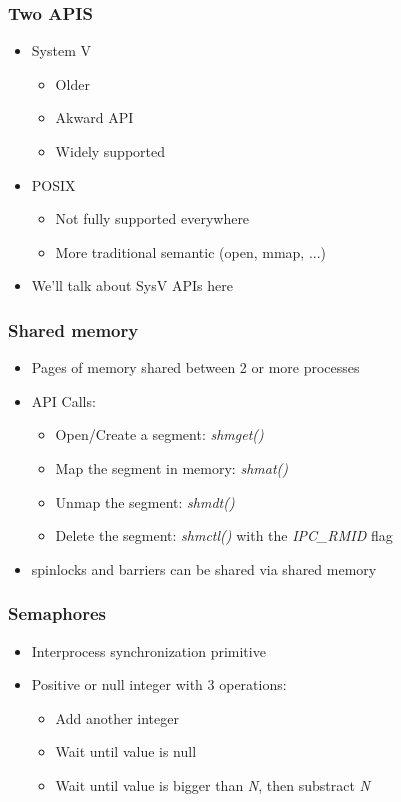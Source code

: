 \begin{frame}
  \frametitle{Two APIS}

  \begin{itemize}
  \item System V
    \begin{itemize}
    \item Older
    \item Akward API
    \item Widely supported
    \end{itemize}
  \item POSIX
    \begin{itemize}
    \item Not fully supported everywhere
    \item More traditional semantic (open, mmap, ...)
    \end{itemize}
  \item We'll talk about SysV APIs here
  \end{itemize}
\end{frame}

\begin{frame}
  \frametitle{Shared memory}

  \begin{itemize}
  \item Pages of memory shared between 2 or more processes
  \item API Calls:
    \begin{itemize}
    \item Open/Create a segment: \emph{shmget()}
    \item Map the segment in memory: \emph{shmat()}
    \item Unmap the segment: \emph{shmdt()}
    \item Delete the segment: \emph{shmctl()} with the \emph{IPC\_RMID} flag
    \end{itemize}
  \item spinlocks and barriers can be shared via shared memory
  \end{itemize}
\end{frame}


\begin{frame}
  \frametitle{Semaphores}

  \begin{itemize}
  \item Interprocess synchronization primitive
  \item Positive or null integer with 3 operations:
    \begin{itemize}
    \item Add another integer
    \item Wait until value is null
    \item Wait until value is bigger than \emph{N}, then substract \emph{N}
    \end{itemize}
  \end{itemize}
\end{frame}

